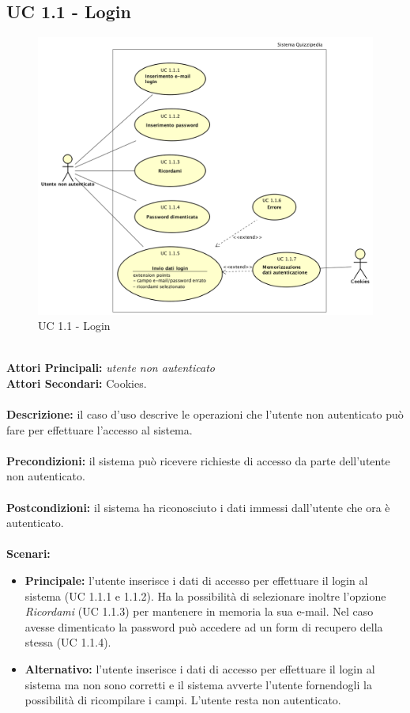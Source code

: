 \documentclass[a4paper,11pt]{article}
\begin{document}
\subsection{UC 1.1 - Login}
\begin{figure}[h!]
\centering
\includegraphics[scale=0.4]{../immagini/UC1_1.png}
\caption{UC 1.1 - Login}
\end{figure}

\ \\
\textbf{Attori Principali:} \textit{utente non autenticato}
\\
\textbf{Attori Secondari:} Cookies.\\
\\
\textbf{Descrizione:} il caso d'uso descrive le operazioni che l'utente non autenticato può fare per effettuare l'accesso al sistema.\\
\\
\textbf{Precondizioni:} il sistema può ricevere richieste di accesso da parte dell'utente non autenticato.\\
\\
\textbf{Postcondizioni:} il sistema ha riconosciuto i dati immessi dall'utente che ora è autenticato.\\
\\
\textbf{Scenari:}
\begin{itemize}
\item \textbf{Principale: } l'utente inserisce i dati di accesso per effettuare il login al sistema (UC 1.1.1 e 1.1.2). Ha la possibilità di selezionare inoltre l'opzione \textit{Ricordami} (UC 1.1.3) per mantenere in memoria la sua e-mail. Nel caso avesse dimenticato la password può accedere ad un form di recupero della stessa (UC 1.1.4). 
\item \textbf{Alternativo: } l'utente inserisce i dati di accesso per effettuare il login al sistema ma non sono corretti e il sistema avverte l'utente fornendogli la possibilità di ricompilare i campi. L'utente resta non autenticato.
\end{itemize}
\end{document}
